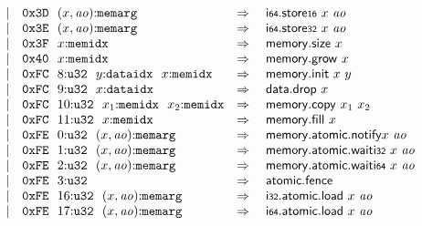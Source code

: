 $$\begin{array}[t]{@{}lrrl@{}l@{}l@{}l@{}}
& & | & \mathtt{0x3D}~~(x, {\mathit{ao}}){:}{\mathtt{memarg}} & \quad\Rightarrow\quad{} & {\mathsf{i{\scriptstyle 64}}{.}\mathsf{store}}{\mathsf{{\scriptstyle 16}}}~x~{\mathit{ao}} \\
& & | & \mathtt{0x3E}~~(x, {\mathit{ao}}){:}{\mathtt{memarg}} & \quad\Rightarrow\quad{} & {\mathsf{i{\scriptstyle 64}}{.}\mathsf{store}}{\mathsf{{\scriptstyle 32}}}~x~{\mathit{ao}} \\
& & | & \mathtt{0x3F}~~x{:}{\mathtt{memidx}} & \quad\Rightarrow\quad{} & \mathsf{memory{.}size}~x \\
& & | & \mathtt{0x40}~~x{:}{\mathtt{memidx}} & \quad\Rightarrow\quad{} & \mathsf{memory{.}grow}~x \\
& & | & \mathtt{0xFC}~~8{:}{\mathtt{u32}}~~y{:}{\mathtt{dataidx}}~~x{:}{\mathtt{memidx}} & \quad\Rightarrow\quad{} & \mathsf{memory{.}init}~x~y \\
& & | & \mathtt{0xFC}~~9{:}{\mathtt{u32}}~~x{:}{\mathtt{dataidx}} & \quad\Rightarrow\quad{} & \mathsf{data{.}drop}~x \\
& & | & \mathtt{0xFC}~~10{:}{\mathtt{u32}}~~x_1{:}{\mathtt{memidx}}~~x_2{:}{\mathtt{memidx}} & \quad\Rightarrow\quad{} & \mathsf{memory{.}copy}~x_1~x_2 \\
& & | & \mathtt{0xFC}~~11{:}{\mathtt{u32}}~~x{:}{\mathtt{memidx}} & \quad\Rightarrow\quad{} & \mathsf{memory{.}fill}~x \\
& & | & \mathtt{0xFE}~~0{:}{\mathtt{u32}}~~(x, {\mathit{ao}}){:}{\mathtt{memarg}} & \quad\Rightarrow\quad{} & {\mathsf{memory{.}atomic{.}notify}}{x}~{\mathit{ao}} \\
& & | & \mathtt{0xFE}~~1{:}{\mathtt{u32}}~~(x, {\mathit{ao}}){:}{\mathtt{memarg}} & \quad\Rightarrow\quad{} & {\mathsf{memory{.}atomic{.}wait}}{\mathsf{i{\scriptstyle 32}}}~x~{\mathit{ao}} \\
& & | & \mathtt{0xFE}~~2{:}{\mathtt{u32}}~~(x, {\mathit{ao}}){:}{\mathtt{memarg}} & \quad\Rightarrow\quad{} & {\mathsf{memory{.}atomic{.}wait}}{\mathsf{i{\scriptstyle 64}}}~x~{\mathit{ao}} \\
& & | & \mathtt{0xFE}~~3{:}{\mathtt{u32}} & \quad\Rightarrow\quad{} & \mathsf{atomic{.}fence} \\
& & | & \mathtt{0xFE}~~16{:}{\mathtt{u32}}~~(x, {\mathit{ao}}){:}{\mathtt{memarg}} & \quad\Rightarrow\quad{} & \mathsf{i{\scriptstyle 32}}{.}\mathsf{atomic}{.}\mathsf{load}~x~{\mathit{ao}} \\
& & | & \mathtt{0xFE}~~17{:}{\mathtt{u32}}~~(x, {\mathit{ao}}){:}{\mathtt{memarg}} & \quad\Rightarrow\quad{} & \mathsf{i{\scriptstyle 64}}{.}\mathsf{atomic}{.}\mathsf{load}~x~{\mathit{ao}} \\

\end{array}$$
